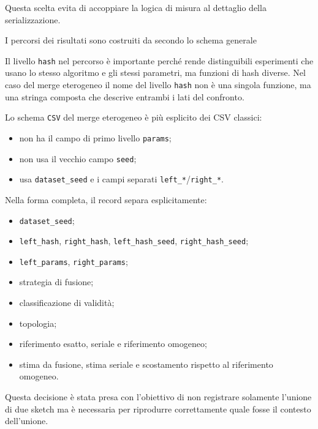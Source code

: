 Questa scelta evita di accoppiare la logica di misura al dettaglio della
serializzazione.

I percorsi dei risultati sono costruiti da
 secondo lo schema generale
\begin{center}
\small
{}
\end{center}

Il livello \texttt{hash} nel percorso è importante perché rende distinguibili
esperimenti che usano lo stesso algoritmo e gli stessi parametri, ma funzioni di
hash diverse. Nel caso del merge eterogeneo il nome del livello \texttt{hash}
non è una singola funzione, ma una stringa composta che descrive entrambi i lati
del confronto.

Lo schema \texttt{CSV} del merge eterogeneo è più esplicito dei CSV classici:
\begin{itemize}
    \item non ha il campo di primo livello \texttt{params};
    \item non usa il vecchio campo \texttt{seed};
    \item usa \texttt{dataset\_seed} e i campi separati
    \texttt{left\_*}/\texttt{right\_*}.
\end{itemize}

Nella forma completa, il record separa esplicitamente:
\begin{itemize}
    \item \texttt{dataset\_seed};
    \item \texttt{left\_hash}, \texttt{right\_hash},
    \texttt{left\_hash\_seed}, \texttt{right\_hash\_seed};
    \item \texttt{left\_params}, \texttt{right\_params};
    \item strategia di fusione;
    \item classificazione di validità;
    \item topologia;
    \item riferimento esatto, seriale e riferimento omogeneo;
    \item stima da fusione, stima seriale e scostamento rispetto al riferimento
    omogeneo.
\end{itemize}

Questa decisione \`e stata presa con l'obiettivo di non registrare solamente l'unione di due sketch
ma \`e necessaria per riprodurre correttamente quale fosse il contesto dell'unione.

